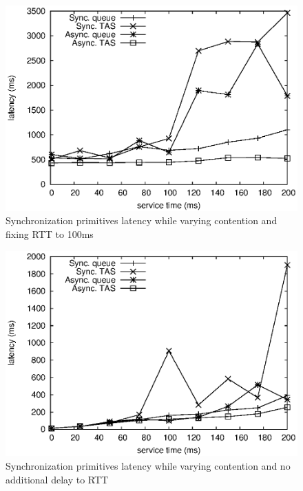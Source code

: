 \begin{figure}[h]
\centering
\includegraphics[scale=0.72]{img/primitives_vary-contention_rtt-100.eps}
\caption{Synchronization primitives latency while varying contention and fixing RTT to 100ms}
\label{fig:primitives_vary_contention_rtt100}
\end{figure}

\begin{figure}[h]
\centering
\includegraphics[scale=0.72]{img/primitives_vary-contention_rtt-0.eps}
\caption{Synchronization primitives latency while varying contention and no additional delay to RTT}
\label{fig:primitives_vary_contention_rtt0}
\end{figure}

